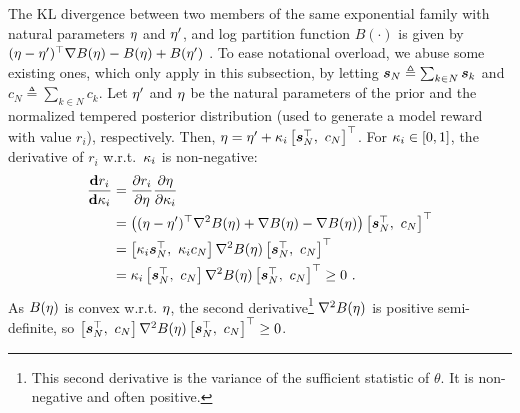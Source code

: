 \documentclass{article}
\theoremstyle{plain}
\theoremstyle{definition}
\theoremstyle{remark}
\begin{document}
The KL divergence between two members of the same exponential family with natural parameters $\mathbf{\eta}$ and $\mathbf{\eta}'$, and log partition function $B(\cdot)$ is given by $(\mathbf{\eta} - \mathbf{\eta}')^\top \nabla B(\mathbf{\eta}) - B(\mathbf{\eta}) + B(\mathbf{\eta}')$ \cite{nielsen2010expkl}.
To ease notational overload,
we abuse some existing ones, which only apply in this subsection, by letting ${\bm{s}}_N \triangleq \sum_{k \in N} {\bm{s}}_k$ and $c_N \triangleq \sum_{k \in N} c_k$.
Let $\mathbf{\eta}'$ and $\mathbf{\eta}$ be the natural parameters of the prior and the normalized tempered posterior distribution (used to generate a model reward with value $r_i$), respectively. Then, $\mathbf{\eta} = \mathbf{\eta}'+ {\kappa_i}\begin{bmatrix} {\bm{s}}_N^\top, \ c_N  \end{bmatrix}^\top$.
For ${\kappa_i} \in [0,1]$, the derivative of $r_i$ w.r.t.~${\kappa_i}$ is non-negative:
\begin{align*}
\frac{\mathbf{d} r_i}{\mathbf{d} \scalei} 
& = \frac{\partial r_i}{\partial \eta} \frac{\partial \eta}{\partial \scalei} \\
& = \left((\veta - \veta')^\top \nabla^2 B(\veta) + \nabla B(\veta) -\nabla B(\veta)\right) \begin{bmatrix} \vs_N^\top, \ c_N  \end{bmatrix}^\top \\
& = \begin{bmatrix} \scalei\vs_N^\top,\ \scalei c_N  \end{bmatrix} \nabla^2 B(\veta) \begin{bmatrix} \vs_N^\top, \ c_N  \end{bmatrix}^\top \\
& = \scalei\begin{bmatrix} \vs_N^\top,\ c_N  \end{bmatrix} \nabla^2 B(\veta) \begin{bmatrix} \vs_N^\top, \ c_N  \end{bmatrix}^\top
 \geq 0 \ .
\end{align*}
As $B(\mathbf{\eta})$ is convex w.r.t. $\mathbf{\eta}$, the second derivative\footnote{This second derivative is the variance of the sufficient statistic of $\theta$. It is non-negative and often positive.} $\nabla^2 B(\mathbf{\eta})$ is positive semi-definite, so $\begin{bmatrix} {\bm{s}}_N^\top,\ c_N  \end{bmatrix} \nabla^2 B(\mathbf{\eta}) \begin{bmatrix} {\bm{s}}_N^\top, \ c_N  \end{bmatrix}^\top \geq 0$.
\end{document}
